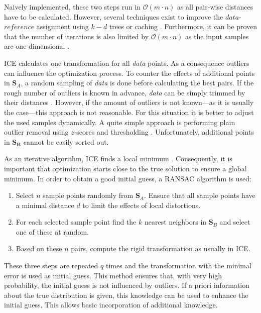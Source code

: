 \documentclass[conference]{IEEEtran}
\theoremstyle{examplestyle}
\begin{document}
Naively implemented, these two steps run in \(\mathcal{O}(m \cdot n)\) as all pair-wise distances have to be calculated. However, several techniques exist to improve the \(data\)-\(reference\) assignment using \(k-d\) trees or caching \cite{Pomerleau2015}. Furthermore, it can be proven that the number of iterations is also limited by \(\mathcal{O}(m \cdot n)\) as the input samples are one-dimensional \cite{Ezra2008}.

\ac{ICE} calculates one transformation for all \textit{data} points. As a consequence outliers can influence the optimization process. To counter the effects of additional points in \(\pmb{S}_A\), a random sampling of \textit{data} is done before calculating the best pairs. If the rough number of outliers is known in advance, \textit{data} can be simply trimmed by their distances \cite{Chetverikov2002}. However, if the amount of outliers is not known---as it is usually the case---this approach is not reasonable. For this situation it is better to adjust the used samples dynamically. A quite simple approach is performing plain outlier removal using \(z\)-scores and thresholding \cite{Phillips2007}. Unfortunately, additional points in \(\pmb{S_B}\) cannot be easily sorted out.


As an iterative algorithm, \ac{ICE} finds a local minimum \cite{Do2008}. Consequently, it is important that optimization starts close to the true solution to ensure a global minimum. In order to obtain a good initial guess, a \ac{RANSAC} \cite{Fischler1981} algorithm is used:
\begin{enumerate}
	\item Select \(n\) sample points randomly from \(\pmb{S}_A\). Ensure that all sample points have a minimal distance \(d\) to limit the effects of local distortions.
	\item For each selected sample point find the \(k\) nearest neighbors in \(\pmb{S}_B\) and select one of these at random.
	\item Based on these \(n\) pairs, compute the rigid transformation as usually in \ac{ICE}.
\end{enumerate}

These three steps are repeated \(q\) times and the transformation with the minimal error is used as initial guess. This method ensures that, with very high probability, the initial guess is not influenced by outliers. If a priori information about the true distribution is given, this knowledge can be used to enhance the initial guess. This allows basic incorporation of additional knowledge.
\end{document}
